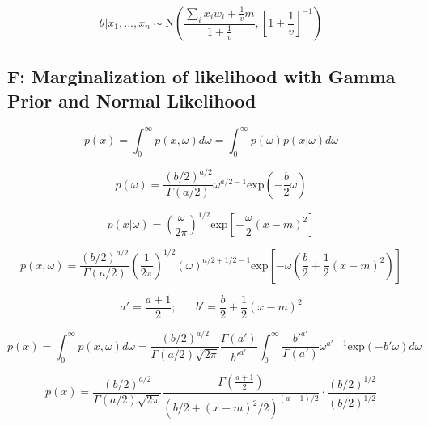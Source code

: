 \documentclass[12pt]{article}
\begin{document}
        \begin{equation}
            \theta|x_1,...,x_n \sim \text{N}\left( \frac{\sum_i x_i w_i + \frac{1}{v}m}{1 + \frac{1}{v}}, \left [ 1 + \frac{1}{v}\right]^{-1}\right)
        \end{equation}


    \subsection*{F: Marginalization of likelihood with Gamma Prior and Normal Likelihood}

        \begin{equation}
              p(x) = \int_0^{\infty} p(x,\omega)d\omega = \int_0^{\infty} p(\omega)p(x|\omega)d\omega
        \end{equation}

        \begin{equation}
              p(\omega) = \frac{(b/2)^{a/2}}{\Gamma(a/2)}{\omega}^{a/2-1} \text{exp}\left (-\frac{b}{2}\omega \right)
        \end{equation}

        \begin{equation}
              p(x|\omega) = \left( \frac{\omega}{2 \pi}\right)^{1/2} \text{exp} \left [ -\frac{\omega}{2}(x - m)^2\right]
        \end{equation}

        \begin{equation}
              p(x,\omega) = \frac{(b/2)^{a/2}}{\Gamma(a/2)}  \left( \frac{1}{2 \pi}\right)^{1/2} (\omega)^{a/2+1/2-1}\text{exp}\left[-\omega \left( \frac{b}{2} + \frac{1}{2}(x - m)^2\right) \right]
        \end{equation}

        \begin{equation}
              a' = \frac{a+1}{2}; \hspace{20pt} b'= \frac{b}{2} + \frac{1}{2}(x-m)^2
        \end{equation}

        \begin{equation}
              p(x) = \int_0^{\infty}p(x, \omega) d\omega = \frac{(b/2)^{a/2}}{\Gamma(a/2) \sqrt{2\pi}} \frac{\Gamma(a')}{b'^{a'}} \int_0^{\infty} \frac{b'^{a'}}{\Gamma(a')}\omega^{a'-1} \text{exp}(-b' \omega) d\omega
        \end{equation}

        \begin{equation}
              p(x) = \frac{(b/2)^{a/2}}{\Gamma(a/2) \sqrt{2\pi}} \frac{\Gamma(\frac{a+1}{2})}{(b/2 + (x-m)^2/2)^{(a+1)/2}} \cdot \frac{(b/2)^{1/2}}{(b/2)^{1/2}}
        \end{equation}
\end{document}
